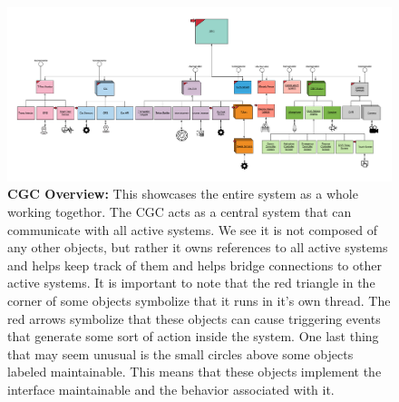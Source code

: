 \documentclass[12pt]{article}
\begin{document}
\begin{figure}[H]
    \centerline{\includegraphics[scale=.095]{CGCOverview.png}}
    \caption{\textbf{CGC Overview:} This showcases the entire system as a whole working togethor. The CGC 
acts as a central system that can communicate with all active systems. We see it is not composed 
of any other objects, but rather it owns references to all active systems and helps keep track of 
them and helps bridge connections to other active systems. It is important to note that the red 
triangle in the corner of some objects symbolize that it runs in it's own thread. The red arrows 
symbolize that these objects can cause triggering events that generate some sort of action inside the 
system. One last thing that may seem unusual is the small circles above some objects labeled 
maintainable. This means that these objects implement the interface maintainable and the behavior 
associated with it.}
  \label{fig:CGCOverview}
\end{figure}    
\end{document}
